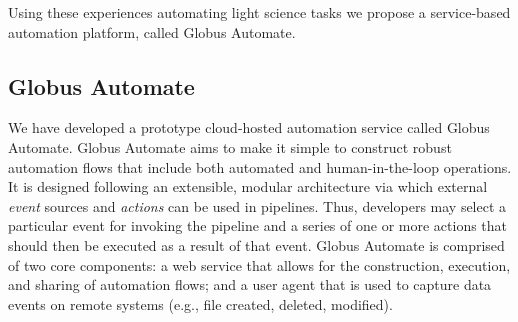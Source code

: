 \documentclass{aip-cp}
\begin{document}
Using these experiences automating light science tasks we propose a service-based automation 
platform, called Globus Automate. 





\subsection{Globus Automate}


We have developed a prototype cloud-hosted automation service called Globus Automate. 
Globus Automate aims to make it simple to construct robust automation flows
that include both automated and human-in-the-loop operations. 
It is designed following an extensible, modular architecture via which external
\emph{event} sources and \emph{actions} can be used in pipelines. 
Thus, developers may select a particular event for invoking the pipeline
and a series of one or more actions that should then be executed as 
a result of that event.
Globus Automate is comprised of two core components: a web service
that allows for the construction, execution, and sharing of automation
flows; and a user agent that is used to capture data events on remote systems
(e.g., file created, deleted, modified). 
\end{document}
